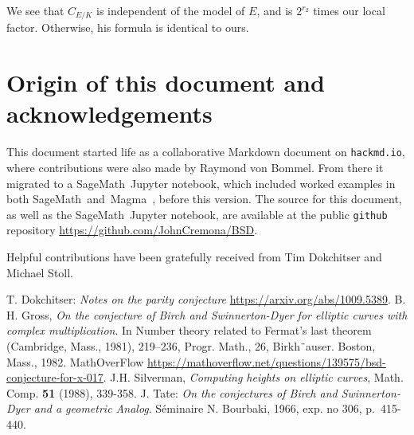 \documentclass{amsart}
\newcommand{\software}[1]{\textsf{#1}} %
\newcommand{\Sage}{\software{SageMath}{}\ }
\newcommand{\Magma}{\software{Magma}{}\ }
\begin{document}
We see that \(C_{E/K}\) is independent of the model of \(E\), and is
$2^{r_2}$ times our local factor.  Otherwise, his formula is identical
to ours.

\section{Origin of this document and acknowledgements}
This document started life as a collaborative Markdown document on
{\tt hackmd.io}, where contributions were also made by Raymond von
Bommel.  From there it migrated to a \Sage Jupyter notebook, which
included worked examples in both \Sage and~\Magma, before this
version.  The source for this document, as well as the \Sage Jupyter
notebook, are available at the public {\tt github} repository
\url{https://github.com/JohnCremona/BSD}.

Helpful contributions have been gratefully received from Tim
Dokchitser and Michael Stoll.

\begin{thebibliography}{99}
  T. Dokchitser: \textit{Notes on the parity conjecture}
  \url{https://arxiv.org/abs/1009.5389}.
 B. H. Gross, \textit{On the conjecture of Birch and
  Swinnerton-Dyer for elliptic curves with complex multiplication}. In
  Number theory related to Fermat’s last theorem (Cambridge, Mass.,
  1981), 219–236, Progr. Math., 26, Birkh¨auser. Boston, Mass., 1982.
  MathOverFlow\break
  \url{https://mathoverflow.net/questions/139575/bsd-conjecture-for-x-017}.
 J.H. Silverman, \textit{Computing heights on
  elliptic curves}, Math. Comp. {\bf 51} (1988), 339-358.
  J. Tate: \textit{On the conjectures of Birch and Swinnerton-Dyer and a
  geometric Analog}. S\'eminaire N. Bourbaki, 1966, exp. no 306,
  p.~415-440.
\end{thebibliography}
\end{document}
